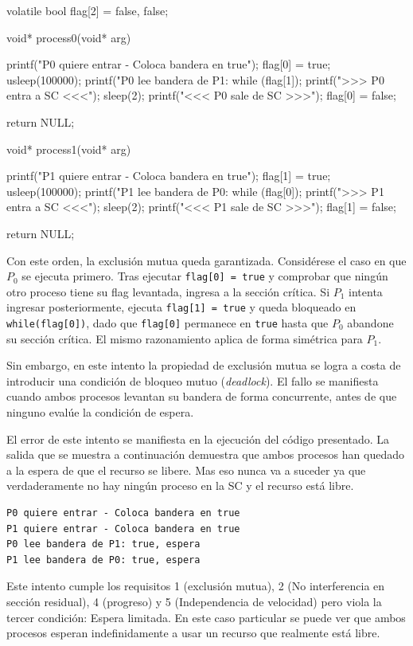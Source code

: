 \begin{ccode}[title=Intento III]
volatile bool flag[2] = {false, false};

void* process0(void* arg) {
  printf("P0 quiere entrar - Coloca bandera en true\n");
  flag[0] = true; usleep(100000);
  printf("P0 lee bandera de P1: %
  while (flag[1]); 
  printf(">>> P0 entra a SC <<<\n");
  sleep(2);
  printf("<<< P0 sale de SC >>>\n");
  flag[0] = false;

  return NULL;
}

void* process1(void* arg) {
  printf("P1 quiere entrar - Coloca bandera en true\n");
  flag[1] = true; usleep(100000);
  printf("P1 lee bandera de P0: %
  while (flag[0]);
  printf(">>> P1 entra a SC <<<\n");
  sleep(2);
  printf("<<< P1 sale de SC >>>\n");
  flag[1] = false;

  return NULL;
}
\end{ccode}

Con este orden, la exclusión mutua queda garantizada. Considérese el caso en que $P_0$ se ejecuta primero. Tras ejecutar \texttt{flag[0] = true} y comprobar que ningún otro proceso tiene su flag levantada, ingresa a la sección crítica. Si $P_1$ intenta ingresar posteriormente, ejecuta \texttt{flag[1] = true} y queda bloqueado en \texttt{while(flag[0])}, dado que \texttt{flag[0]} permanece en \texttt{true} hasta que $P_0$ abandone su sección crítica. El mismo razonamiento aplica de forma simétrica para $P_1$.

Sin embargo, en este intento la propiedad de exclusión mutua se logra a costa de introducir una condición de bloqueo mutuo (\emph{deadlock}). El fallo se manifiesta cuando ambos procesos levantan su bandera de forma concurrente, antes de que ninguno evalúe la condición de espera. 

El error de este intento se manifiesta en la ejecución del código presentado. La salida que se muestra a continuación demuestra que ambos procesos han quedado a la espera de que el recurso se libere. Mas eso nunca va a suceder ya que verdaderamente no hay ningún proceso en la SC y el recurso está libre.
\begin{verbatim}
P0 quiere entrar - Coloca bandera en true
P1 quiere entrar - Coloca bandera en true
P0 lee bandera de P1: true, espera
P1 lee bandera de P0: true, espera
\end{verbatim}

Este intento cumple los requisitos 1 (exclusión mutua), 2 (No interferencia en sección residual), 4 (progreso) y 5 (Independencia de velocidad) pero viola la tercer condición: Espera limitada. En este caso particular se puede ver que ambos procesos esperan indefinidamente a usar un recurso que realmente está libre.


